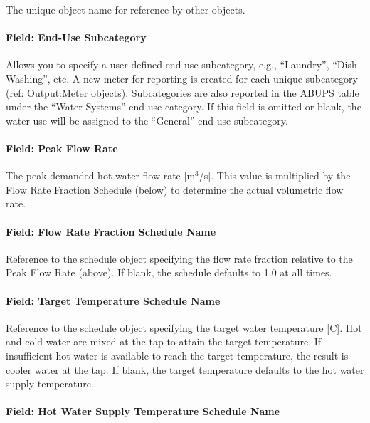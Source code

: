 The unique object name for reference by other objects.

\paragraph{Field: End-Use Subcategory}\label{field-end-use-subcategory-005}

Allows you to specify a user-defined end-use subcategory, e.g., ``Laundry'', ``Dish Washing'', etc. A new meter for reporting is created for each unique subcategory (ref: Output:Meter objects). Subcategories are also reported in the ABUPS table under the ``Water Systems'' end-use category. If this field is omitted or blank, the water use will be assigned to the ``General'' end-use subcategory.

\paragraph{Field: Peak Flow Rate}\label{field-peak-flow-rate-000}

The peak demanded hot water flow rate {[}m\(^{3}\)/s{]}. This value is multiplied by the Flow Rate Fraction Schedule (below) to determine the actual volumetric flow rate.

\paragraph{Field: Flow Rate Fraction Schedule Name}\label{field-flow-rate-fraction-schedule-name-000}

Reference to the schedule object specifying the flow rate fraction relative to the Peak Flow Rate (above). If blank, the schedule defaults to 1.0 at all times.

\paragraph{Field: Target Temperature Schedule Name}\label{field-target-temperature-schedule-name}

Reference to the schedule object specifying the target water temperature {[}C{]}. Hot and cold water are mixed at the tap to attain the target temperature. If insufficient hot water is available to reach the target temperature, the result is cooler water at the tap. If blank, the target temperature defaults to the hot water supply temperature.

\paragraph{Field: Hot Water Supply Temperature Schedule Name}\label{field-hot-water-supply-temperature-schedule-name}

